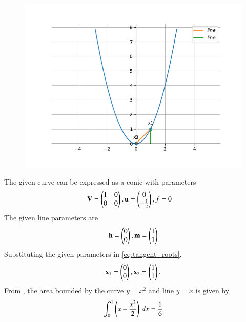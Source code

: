 	\begin{figure}[!h]
		\centering
 \includegraphics[width=\columnwidth]{chapters/12/8/3/2/figs/figure.png}
		\caption{}
		\label{fig:12/8/3/2}
  	\end{figure}
The given curve  can be expressed as a conic with parameters
\begin{align}
	\mathbf{V} &= \begin{pmatrix}1 & 0\\0 & 0\end{pmatrix}, \mathbf{u} = \begin{pmatrix}0 \\-\frac{1}{2}\end{pmatrix}, f = 0
	\end{align}
The given line parameters are
\begin{align}
\mathbf{h} = \begin{pmatrix}0 \\0\end{pmatrix}, \mathbf{m}=\begin{pmatrix}1\\1\end{pmatrix}
\end{align}
Substituting the given parameters in 
\eqref{eq:tangent_roots},
\begin{align}
\mathbf{x}_1=\begin{pmatrix}0\\0\end{pmatrix}, \mathbf{x}_2=\begin{pmatrix}1\\1\end{pmatrix}.
\end{align}
From  
		,
the area bounded by the curve $y=x^2$ and line $y=x$ is given by
\begin{align}
	\int_{0}^{1} \left(x 
	-\frac{x^2}{2}\right) \,dx = \frac{1}{6}
\end{align}
